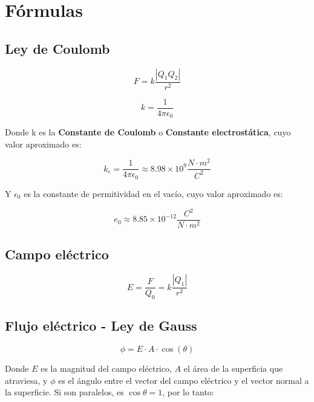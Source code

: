 \section*{Fórmulas}

\subsection*{Ley de Coulomb}

\begin{equation}
    F = k\frac{|Q_1Q_2|}{r^{2}}
\end{equation}

\begin{equation}
    k = \frac{1}{4\pi\epsilon_0}
\end{equation}

Donde k es la \textbf{Constante de Coulomb} o
\textbf{Constante electrostática},
cuyo valor aproximado es:

\begin{equation}
    k_\epsilon = \frac{1}{4\pi\epsilon_0} \approx 8.98 \times 10^{9} \frac{N\cdot m^{2}}{C^{2}}
\end{equation}

Y \(\epsilon_0\) es la constante de permitividad en el vacío,
cuyo valor aproximado es:

\begin{equation}
    e_0 \approx 8.85 \times 10^{-12} \frac{C^{2}}{N\cdot m^{2}}
\end{equation}

\subsection*{Campo eléctrico}

\begin{equation}
    E = \frac{F}{Q_0} = k\frac{|Q_1|}{r^{2}}
\end{equation}

\subsection*{Flujo eléctrico - Ley de Gauss}

\begin{equation}
    \phi=E\cdot A \cdot \cos(\theta)
\end{equation}

Donde \(E\) es la magnitud del campo eléctrico,
\(A\) el área de la superficia que atraviesa,
y \(\phi\) es el ángulo entre el vector del campo eléctrico y 
el vector normal a la superficie.
Si son paralelos, es \(\cos\theta = 1\),
por lo tanto: 

